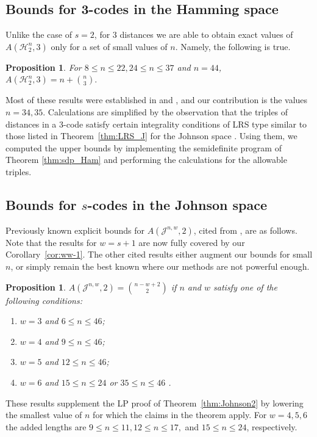 \documentclass{amsart}
\newtheorem{propositionenv}[definitionenv]{Proposition}
\newenvironment{proposition}{\begin{propositionenv}\rm}{\end{propositionenv}}
\newcommand{\cH}{\mathcal{H}}
\newcommand{\cJ}{\mathcal{J}}
\begin{document}
\subsection{Bounds for 3-codes in the Hamming space}
Unlike the case of $s=2$, for 3 distances we are able to obtain exact values of $A(\cH_2^n,3)$ only for a set of small values of 
$n$. Namely, the following is true.
\begin{proposition} For $8\le n\le 22, 24\le n\le 37$ and $n=44$, $A(\cH_2^n,3)=n+\binom n3.$
\end{proposition}
Most of these results were established in \cite{BM11} and \cite{MN11}, and our contribution is the values $n=34,35.$
Calculations are simplified by the observation that the triples of distances in a 3-code satisfy certain integrality conditions of LRS type similar to those listed in Theorem~\ref{thm:LRS_J} for the Johnson space \cite{MN11}. Using them, we computed the upper bounds by implementing the semidefinite program of Theorem \ref{thm:sdp_Ham} and performing the calculations for the allowable triples. 

\subsection{Bounds for \texorpdfstring{$s$}--codes in the Johnson space}
\label{sec:numerical2}
Previously known explicit bounds for $A(\cJ^{n,w},2)$, cited from \cite{BM11,MN11}, are as follows. Note that the results for $w=s+1$ are now fully covered by our Corollary~\ref{cor:ww-1}. The other cited results either augment our bounds for small $n$, or simply remain the best known where our methods are not powerful enough.
\begin{proposition}
\label{prop:2_dis_equal_J}
$A(\cJ^{n, w}, 2) = \binom{n-w+2}{2}$ if $n$ and $w$ satisfy one of the following conditions:
{\begin{enumerate}
    \item
    $w=3$ and $6\le n\le 46$;
   \item
   $w=4$ and $9\le n\le 46$;
    \item
    $w=5$ and $12\le n\le 46$;
    \item
    $w=6$ and $15\le n\le24$ or $35 \leq n \leq 46$ .
\end{enumerate}}
\end{proposition}
These results supplement the LP proof of Theorem~\ref{thm:Johnson2} by lowering the smallest value of $n$
for which the claims in the theorem apply. For $w=4,5,6$ the added lengths are $9\le n\le 11, 12\le n\le 17,$ and
$15\le n\le 24$, respectively.
\end{document}
